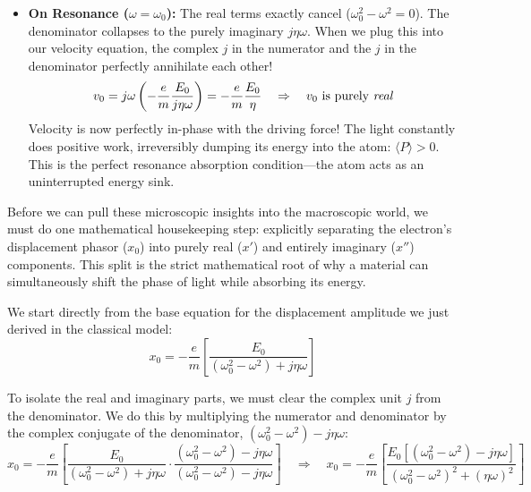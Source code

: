 \begin{keyinsight}
\begin{itemize}
        \item \textbf{On Resonance ($\omega = \omega_0$):} The real terms exactly cancel ($\omega_0^2 - \omega^2 = 0$). The denominator collapses to the purely imaginary $j\eta\omega$. When we plug this into our velocity equation, the complex $j$ in the numerator and the $j$ in the denominator perfectly annihilate each other!
              \begin{equation*}
                  v_0 = j\omega \left( -\frac{e}{m}\frac{E_0}{j\eta\omega} \right) = -\frac{e}{m}\frac{E_0}{\eta} \quad \Rightarrow \quad v_0 \text{ is purely \emph{real}}
              \end{equation*}
              Velocity is now perfectly in-phase with the driving force! The light constantly does positive work, irreversibly dumping its energy into the atom: $\langle P \rangle > 0$. This is the perfect resonance absorption condition—the atom acts as an uninterrupted energy sink.
    \end{itemize}
\end{keyinsight}

Before we can pull these microscopic insights into the macroscopic world, we must do one mathematical housekeeping step: explicitly separating the electron's displacement phasor ($x_0$) into purely real ($x'$) and entirely imaginary ($x''$) components. This split is the strict mathematical root of why a material can simultaneously shift the phase of light while absorbing its energy.

We start directly from the base equation for the displacement amplitude we just derived in the classical model:
\begin{equation*}
    x_0 = -\frac{e}{m} \left[ \frac{E_0}{(\omega_0^2 - \omega^2) + j\eta\omega} \right]
\end{equation*}

To isolate the real and imaginary parts, we must clear the complex unit $j$ from the denominator. We do this by multiplying the numerator and denominator by the complex conjugate of the denominator, $(\omega_0^2 - \omega^2) - j\eta\omega$:
\begin{equation*}
    x_0 = -\frac{e}{m} \left[ \frac{E_0}{(\omega_0^2 - \omega^2) + j\eta\omega} \cdot \frac{(\omega_0^2 - \omega^2) - j\eta\omega}{(\omega_0^2 - \omega^2) - j\eta\omega} \right] \quad \Rightarrow \quad x_0 = -\frac{e}{m} \left[ \frac{E_0[(\omega_0^2 - \omega^2) - j\eta\omega]}{(\omega_0^2 - \omega^2)^2 + (\eta\omega)^2} \right]
\end{equation*}

